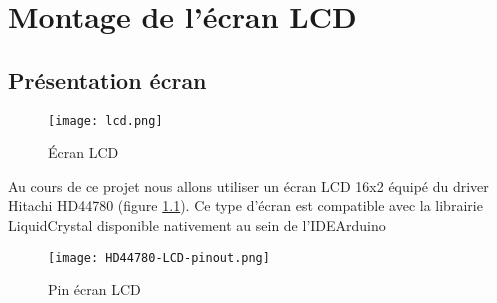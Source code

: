\chapter{Montage de l’écran LCD}

\section{Présentation écran}
\begin{figure}[h]
	\centering
	\texttt{[image: lcd.png]}
    \caption{Écran LCD}
    \label{lcd}
\end{figure}
Au cours de ce projet nous allons utiliser un écran LCD 16x2 équipé du driver Hitachi HD44780 (figure \ref{lcd}). Ce type d'écran est compatible avec la librairie \og LiquidCrystal \fg disponible nativement au sein de l'IDE\footnotemark Arduino 


\begin{figure}[h]
	\centering
	\texttt{[image: HD44780-LCD-pinout.png]}
    \caption{Pin écran LCD}
    \label{PinLCD}    
\end{figure}


